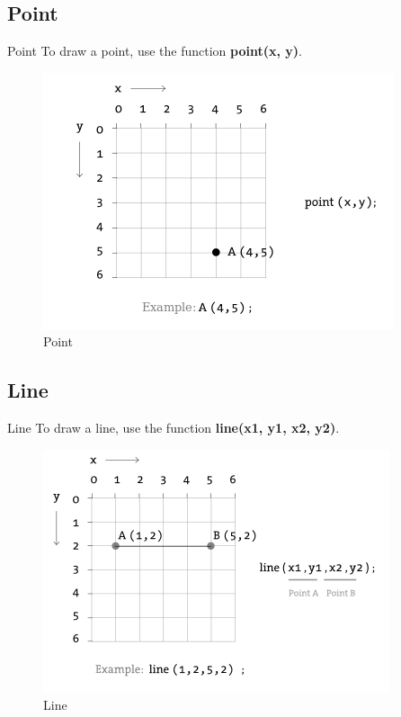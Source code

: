 \documentclass{beamer}
\begin{document}
\subsection{Point}

\begin{frame}{Point}
To draw a point, use the function \textbf{point(x, y)}.

\begin{figure}[H]
\centerline{\includegraphics[scale=0.5]{point.png}}
\caption{Point}
\end{figure}
\end{frame}

\subsection{Line}

\begin{frame}{Line}
To draw a line, use the function \textbf{line(x1, y1, x2, y2)}.

\begin{figure}[H]
\centerline{\includegraphics[scale=0.5]{line.png}}
\caption{Line}
\end{figure}
\end{frame}
\end{document}
